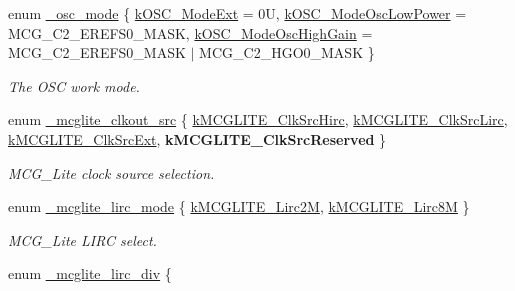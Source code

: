 \begin{DoxyCompactItemize}
enum \mbox{\hyperlink{group__clock_ga12cda0e98e38fafaa3ebc980ce32605f}{\+\_\+osc\+\_\+mode}} \{ \mbox{\hyperlink{group__clock_gga12cda0e98e38fafaa3ebc980ce32605fa40da5141b08af28fd3ed71d0c061a664}{k\+O\+S\+C\+\_\+\+Mode\+Ext}} = 0U, 
\mbox{\hyperlink{group__clock_gga12cda0e98e38fafaa3ebc980ce32605fa4412c07d6d2fd83dfa4c788f5bd72f18}{k\+O\+S\+C\+\_\+\+Mode\+Osc\+Low\+Power}} = M\+C\+G\+\_\+\+C2\+\_\+\+E\+R\+E\+F\+S0\+\_\+\+M\+A\+SK, 
\mbox{\hyperlink{group__clock_gga12cda0e98e38fafaa3ebc980ce32605fa44206e2acfed4fd6f9764047d9f469ae}{k\+O\+S\+C\+\_\+\+Mode\+Osc\+High\+Gain}} = M\+C\+G\+\_\+\+C2\+\_\+\+E\+R\+E\+F\+S0\+\_\+\+M\+A\+SK $\vert$ M\+C\+G\+\_\+\+C2\+\_\+\+H\+G\+O0\+\_\+\+M\+A\+SK
 \}
\begin{DoxyCompactList}\small\item\em The O\+SC work mode. \end{DoxyCompactList}\item 
enum \mbox{\hyperlink{group__clock_ga368b350a921470dc046d2403ea2fedf3}{\+\_\+mcglite\+\_\+clkout\+\_\+src}} \{ \mbox{\hyperlink{group__clock_gga368b350a921470dc046d2403ea2fedf3a79240e49c2ea1826752b6777c06f707c}{k\+M\+C\+G\+L\+I\+T\+E\+\_\+\+Clk\+Src\+Hirc}}, 
\mbox{\hyperlink{group__clock_gga368b350a921470dc046d2403ea2fedf3affff7325f43a6a775263204658c02f0a}{k\+M\+C\+G\+L\+I\+T\+E\+\_\+\+Clk\+Src\+Lirc}}, 
\mbox{\hyperlink{group__clock_gga368b350a921470dc046d2403ea2fedf3af2a61e2318656501eb9921d625a3fc68}{k\+M\+C\+G\+L\+I\+T\+E\+\_\+\+Clk\+Src\+Ext}}, 
{\bfseries k\+M\+C\+G\+L\+I\+T\+E\+\_\+\+Clk\+Src\+Reserved}
 \}
\begin{DoxyCompactList}\small\item\em M\+C\+G\+\_\+\+Lite clock source selection. \end{DoxyCompactList}\item 
enum \mbox{\hyperlink{group__clock_gab91799aa690e0aca9897dbc4887c3945}{\+\_\+mcglite\+\_\+lirc\+\_\+mode}} \{ \mbox{\hyperlink{group__clock_ggab91799aa690e0aca9897dbc4887c3945aecc45f9cd9d72b7cb5372bc28d59d813}{k\+M\+C\+G\+L\+I\+T\+E\+\_\+\+Lirc2M}}, 
\mbox{\hyperlink{group__clock_ggab91799aa690e0aca9897dbc4887c3945a1db861733d215202c2759ca36c2d9a1d}{k\+M\+C\+G\+L\+I\+T\+E\+\_\+\+Lirc8M}}
 \}
\begin{DoxyCompactList}\small\item\em M\+C\+G\+\_\+\+Lite L\+I\+RC select. \end{DoxyCompactList}\item 
enum \mbox{\hyperlink{group__clock_ga55ed975b54e118a84549accb908bc08e}{\+\_\+mcglite\+\_\+lirc\+\_\+div}} \{ \newline

\end{DoxyCompactItemize}
